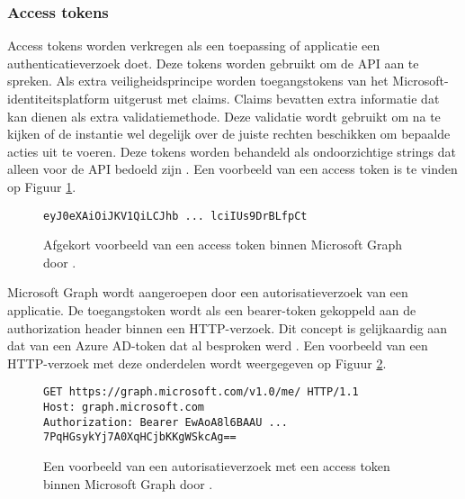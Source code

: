 \subsubsection{Access tokens}


Access tokens worden verkregen als een toepassing of applicatie een authenticatieverzoek doet. Deze tokens worden gebruikt om de \ac{API} aan te spreken. Als extra veiligheidsprincipe worden toegangstokens van het Microsoft-identiteitsplatform uitgerust met claims. Claims bevatten extra informatie dat kan dienen als extra validatiemethode. Deze validatie wordt gebruikt om na te kijken of de instantie wel degelijk over de juiste rechten beschikken om bepaalde acties uit te voeren. Deze tokens worden behandeld als ondoorzichtige strings dat alleen voor de \ac{API} bedoeld zijn \autocite{Microsoft2022b}. Een voorbeeld van een access token is te vinden op Figuur \ref{MSGAT}. \\

\begin{figure}[h]
    \scriptsize
    \begin{verbatim}        
eyJ0eXAiOiJKV1QiLCJhb ... lciIUs9DrBLfpCt
    \end{verbatim}    
    \caption[Afgekort voorbeeld Microsoft Graph access token]{Afgekort voorbeeld van een access token binnen Microsoft Graph door \textcite{Microsoft2022b}.}
    \label{MSGAT}
\end{figure}

Microsoft Graph wordt aangeroepen door een autorisatieverzoek van een applicatie. De toegangstoken wordt als een bearer-token gekoppeld aan de authorization header binnen een \ac{HTTP}-verzoek. Dit concept is gelijkaardig aan dat van een Azure \ac{AD}-token dat al besproken werd \autocite{Microsoft2022b}. Een voorbeeld van een \ac{HTTP}-verzoek met deze onderdelen wordt weergegeven op Figuur \ref{MSGA}. \\

\begin{figure}[h]
    \scriptsize
    \begin{verbatim}
GET https://graph.microsoft.com/v1.0/me/ HTTP/1.1
Host: graph.microsoft.com
Authorization: Bearer EwAoA8l6BAAU ... 7PqHGsykYj7A0XqHCjbKKgWSkcAg==
    \end{verbatim}    
    \caption[Voorbeeld Microsoft Graph Autorisatieverzoek]{Een voorbeeld van een autorisatieverzoek met een access token binnen Microsoft Graph door \textcite{Microsoft2022b}.}
    \label{MSGA}
\end{figure}

